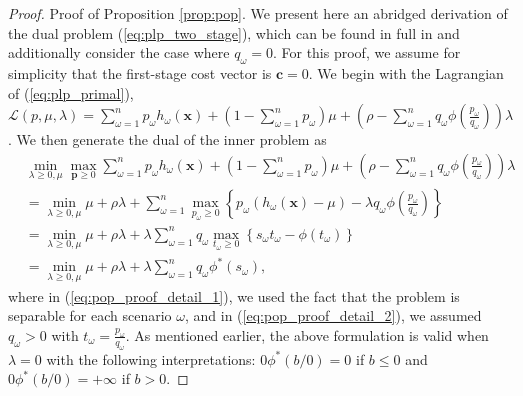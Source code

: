 \documentclass[opre,nonblindrev]{informs3} %
\newcommand{\x}{\mathbf{x}}
\renewcommand{\c}{\mathbf{c}}
\newcommand{\p}{\mathbf{p}}
\begin{document}
\begin{proof}{\sc Proof of Proposition \ref{prop:pop}.}
	We present here an abridged derivation of the dual problem (\ref{eq:plp_two_stage}), which can be found in full in \citep{bental2011robust} and additionally consider the case where $q_\omega = 0$.
	For this proof, we assume for simplicity that the first-stage cost vector is $\c = 0$.	
	We begin with the Lagrangian of (\ref{eq:plp_primal}), $\mathcal{L}(p,\mu,\lambda) = \sum_{\omega=1}^n p_\omega h_\omega(\x) + \left( 1-\sum_{\omega=1}^n p_\omega \right)\mu + \left( \rho - \sum_{\omega=1}^n q_\omega \phi\left(\frac{p_\omega}{q_\omega}\right) \right)\lambda$. 
We then generate the dual of the inner problem as
	\begin{align}
		 & \min_{\lambda \geq 0, \mu} \max_{\p \geq 0} \sum_{\omega=1}^n p_\omega h_\omega(\x) + \left( 1-\sum_{\omega=1}^n p_\omega \right)\mu + \left( \rho - \sum_{\omega=1}^n q_\omega \phi\left(\frac{p_\omega}{q_\omega}\right) \right)\lambda \nonumber \\
		& = \min_{\lambda \geq 0, \mu} \mu + \rho\lambda + \sum_{\omega=1}^n \max_{p_\omega \geq 0} \left\{ p_\omega (h_\omega(\x) - \mu) - \lambda q_\omega \phi\left(\frac{p_\omega}{q_\omega}\right) \right\} \label{eq:pop_proof_detail_1} \\
		& =  \min_{\lambda \geq 0, \mu} \mu + \rho\lambda + \lambda \sum_{\omega=1}^n q_\omega \max_{t_\omega \geq 0} \left\{ s_\omega t_\omega - \phi(t_\omega) \right\} \label{eq:pop_proof_detail_2} \\
		& = \min_{\lambda \geq 0, \mu} \mu + \rho\lambda + \lambda \sum_{\omega=1}^n q_\omega \phi^*\left(s_\omega\right), \nonumber
	\end{align}
	where in (\ref{eq:pop_proof_detail_1}), we used the fact that the problem is separable for each scenario $\omega$, and in (\ref{eq:pop_proof_detail_2}), we assumed $q_\omega > 0$ with $t_\omega = \frac{p_\omega}{q_\omega}$.
	As mentioned earlier, the above formulation is valid when $\lambda =0$ with the following interpretations: $0\phi^*(b/0)=0$ if $b\leq 0$ and  $0\phi^*(b/0)=+\infty$ if $b > 0$.
	

\end{proof}
\end{document}
